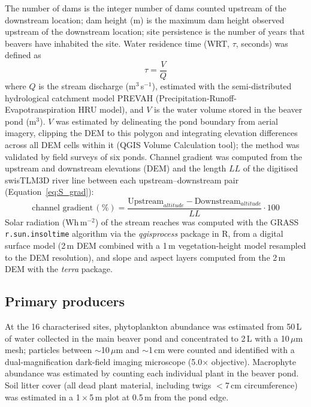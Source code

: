 \documentclass[11pt,a4paper]{article}
\begin{document}
The number of dams is the integer number of dams counted upstream of the downstream location; dam height (m) is the maximum dam height observed upstream of the downstream location; site persistence is the number of years that beavers have inhabited the site. Water residence time (WRT, $\tau$, seconds) was defined as
\begin{equation}
\tau = \frac{V}{Q}
\label{eq:S_wrt}
\end{equation}
where $Q$ is the stream discharge (m$^3$\,s$^{-1}$), estimated with the semi-distributed hydrological catchment model PREVAH (Precipitation-Runoff-Evapotranspiration HRU model), and $V$ is the water volume stored in the beaver pond (m$^3$). $V$ was estimated by delineating the pond boundary from aerial imagery, clipping the DEM to this polygon and integrating elevation differences across all DEM cells within it (QGIS Volume Calculation tool); the method was validated by field surveys of six ponds. Channel gradient was computed from the upstream and downstream elevations (DEM) and the length $LL$ of the digitised swisTLM3D river line between each upstream--downstream pair (Equation~\ref{eq:S_grad}):
\begin{equation}
\text{channel gradient}\,(\%) = \frac{\text{Upstream}_{altitude} - \text{Downstream}_{altitude}}{LL} \cdot 100
\label{eq:S_grad}
\end{equation}
Solar radiation (Wh\,m$^{-2}$) of the stream reaches was computed with the GRASS \texttt{r.sun.insoltime} algorithm via the \emph{qgisprocess} package in R, from a digital surface model (2\,m DEM combined with a 1\,m vegetation-height model resampled to the DEM resolution), and slope and aspect layers computed from the 2\,m DEM with the \emph{terra} package.

\subsection*{Primary producers}

At the 16 characterised sites, phytoplankton abundance was estimated from 50\,L of water collected in the main beaver pond and concentrated to 2\,L with a 10\,$\mu$m mesh; particles between $\sim$10\,$\mu$m and $\sim$1\,cm were counted and identified with a dual-magnification dark-field imaging microscope (5.0$\times$ objective). Macrophyte abundance was estimated by counting each individual plant in the beaver pond. Soil litter cover (all dead plant material, including twigs $<$7\,cm circumference) was estimated in a 1\,$\times$\,5\,m plot at 0.5\,m from the pond edge.
\end{document}
